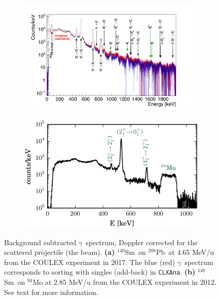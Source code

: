 \documentclass[twoside,english]{uiofysmaster/uiofysmaster}
\newcommand{\blank}[1]{\hspace*{#1}} %
\newcommand{\Sm}{$^{140}$Sm} %
\newcommand{\Pb}{$^{208}$Pb}
\newcommand{\ga}{$\gamma$}
\begin{document}
\begin{figure}[htb!]
	\centering
	\begin{subfigure}[t]{\textwidth}
		\centering
		\includegraphics[width=\textwidth]{../Plots/plotting/gam_dcB_s_and_a.png}
		\caption{}
		\label{fig:gam_dcB}
	\end{subfigure}
	\begin{subfigure}[t]{0.8\textwidth}
		\blank{-1cm}
		\includegraphics[width=\textwidth]{Images/gam_MK.png}
		\caption{}
		\label{fig:gam_MK}
	\end{subfigure}
	\caption{Background subtracted \ga\ spectrum, Doppler corrected for the scattered projectile (the beam).
		\textbf{(a)} \Sm\ on \Pb\ at 4.65 MeV/u from the COULEX experiment in 2017.
	 	The blue (red) \ga\ spectrum corresponds to sorting with singles (add-back) in \texttt{CLXAna}.
		\textbf{(b)} \Sm\ on $^{94}$Mo at 2.85 MeV/u from the COULEX experiment in 2012.  
		See text for more information. \newline 	
	 	}
	\label{fig:gam_compared}
\end{figure}
\end{document}
